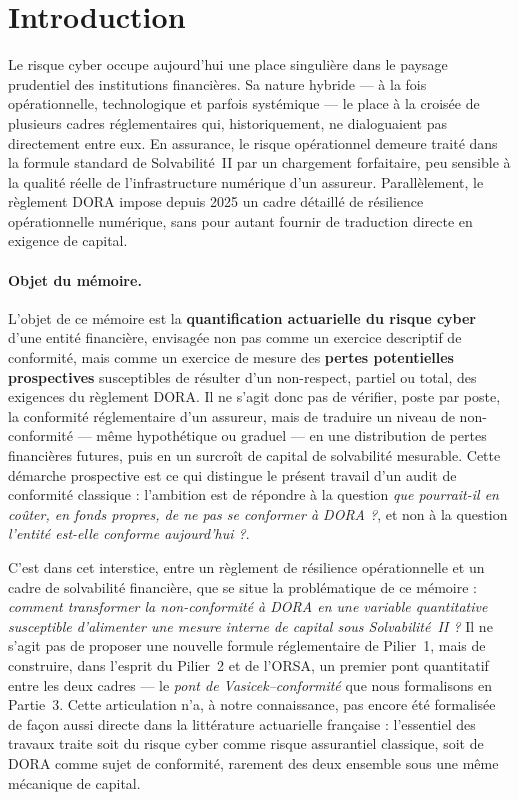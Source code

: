 \documentclass[11pt,a4paper]{article}
\theoremstyle{navystyle}
\theoremstyle{navydef}
\begin{document}
\setcounter{page}{1}

\section*{Introduction}

Le risque cyber occupe aujourd'hui une place singulière dans le paysage
prudentiel des institutions financières. Sa nature hybride --- à la fois
opérationnelle, technologique et parfois systémique --- le place à la
croisée de plusieurs cadres réglementaires qui, historiquement, ne
dialoguaient pas directement entre eux. En assurance, le risque opérationnel
demeure traité dans la formule standard de Solvabilité~II par un chargement
forfaitaire, peu sensible à la qualité réelle de l'infrastructure numérique
d'un assureur. Parallèlement, le règlement DORA impose depuis 2025 un cadre
détaillé de résilience opérationnelle numérique, sans pour autant fournir
de traduction directe en exigence de capital.

\paragraph{Objet du mémoire.} L'objet de ce mémoire est la
\textbf{quantification actuarielle du risque cyber} d'une entité financière,
envisagée non pas comme un exercice descriptif de conformité, mais comme un
exercice de mesure des \textbf{pertes potentielles prospectives}
susceptibles de résulter d'un non-respect, partiel ou total, des exigences du
règlement DORA. Il ne s'agit donc pas de vérifier, poste par poste, la
conformité réglementaire d'un assureur, mais de traduire un niveau de
non-conformité --- même hypothétique ou graduel --- en une distribution de
pertes financières futures, puis en un surcroît de capital de solvabilité
mesurable. Cette démarche prospective est ce qui distingue le présent travail
d'un audit de conformité classique : l'ambition est de répondre à la
question \emph{\og que pourrait-il en coûter, en fonds propres, de ne pas se
conformer à DORA ?\fg{}}, et non à la question \emph{\og l'entité est-elle
conforme aujourd'hui ?\fg{}}.

C'est dans cet interstice, entre un règlement de résilience opérationnelle
et un cadre de solvabilité financière, que se situe la problématique de ce
mémoire : \emph{comment transformer la non-conformité à DORA en une variable
quantitative susceptible d'alimenter une mesure interne de capital sous
Solvabilité~II ?} Il ne s'agit pas de proposer une nouvelle formule
réglementaire de Pilier~1, mais de construire, dans l'esprit du Pilier~2 et
de l'ORSA, un premier pont quantitatif entre les deux cadres --- le \emph{pont de
Vasicek--conformité} que nous formalisons en Partie~3. Cette
articulation n'a, à notre connaissance, pas encore été formalisée de façon
aussi directe dans la littérature actuarielle française : l'essentiel des
travaux traite soit du risque cyber comme risque assurantiel classique, soit
de DORA comme sujet de conformité, rarement des deux ensemble sous une même
mécanique de capital.
\end{document}
